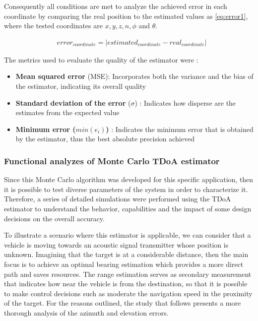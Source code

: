 Consequently all conditions are met to analyze the achieved error in each coordinate by comparing the real position to the estimated values as \ref{eq:error1}, where the tested coordinates are $x, y, z, n, \phi$ and $\theta$.

\begin{eqnarray}
	&error_{coordinate} = |estimated_{coordinate} - real_{coordinate}|
	\label{eq:error1}
\end{eqnarray}

The metrics used to evaluate the quality of the estimator were :

\begin{itemize}
	\item \textbf{Mean squared error} (MSE): Incorporates both the variance and the bias of the estimator, indicating its overall quality
	
	\item \textbf{Standard deviation of the error} ($\sigma$) : Indicates how disperse are the estimates from the expected value
	
	\item \textbf{Minimum error ($min(e_i)$)} : Indicates the minimum error that is obtained by the estimator, thus the best absolute precision achieved
\end{itemize} 

\subsubsection{Functional analyzes of Monte Carlo TDoA estimator}

Since this Monte Carlo algorithm was developed for this specific application, then it is possible to test diverse parameters of the system in order to characterize it. Therefore, a series of detailed simulations were performed using the TDoA estimator to understand the behavior, capabilities and the impact of some design decisions on the overall accuracy.

To illustrate a scenario where this estimator is applicable, we can consider that a vehicle is moving towards an acoustic signal transmitter whose position is unknown. Imagining that the target is at a considerable distance, then the main focus is to achieve an optimal bearing estimation which provides a more direct path and saves resources. The range estimation serves as secondary measurement that indicates how near the vehicle is from the destination, so that it is possible to make control decisions such as moderate the navigation speed in the proximity of the target. For the reasons outlined, the study that follows presents a more thorough analysis of the azimuth and elevation errors. 

